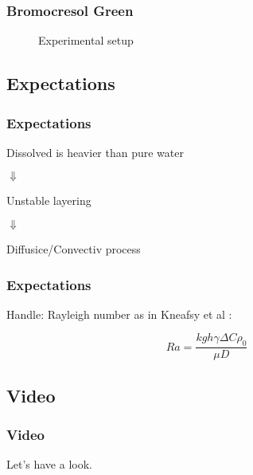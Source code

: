 \begin{frame}
	\frametitle{Bromocresol Green}
	
	\begin{figure}
	  \centering
	  \caption{Experimental setup}
	\end{figure}
\end{frame}

\subsection{Expectations}
\begin{frame}
	\frametitle{Expectations}
	\vspace{1cm} %
	
	\centering
	Dissolved \COT is heavier than pure water
	
	\pause
	$\Downarrow$
	
	Unstable layering
	
	\pause
	$\Downarrow$
	
	Diffusice/Convectiv process
	
\end{frame}

\begin{frame}
	\frametitle{Expectations}
	\vspace{1cm} %
	
	Handle: Rayleigh number as in Kneafsy et al \cite{2010:CO2}:
	
	\begin{equation*}
	  Ra = \frac{kgh \gamma \Delta C \rho_0}{\mu D}
	\end{equation*}

	
\end{frame}


\subsection{Video}
\begin{frame}
	\frametitle{Video}
	\vspace{1cm} %
	
	\centering
	Let's have a look.
 
\end{frame}


